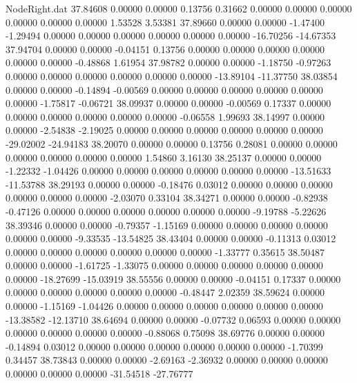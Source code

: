 \begin{filecontents}{NodeRight.dat}
  37.84608    0.00000    0.00000     0.13756    0.31662    0.00000    0.00000    0.00000    0.00000    0.00000    0.00000    1.53528    3.53381
  37.89660    0.00000    0.00000    -1.47400   -1.29494    0.00000    0.00000    0.00000    0.00000    0.00000    0.00000  -16.70256  -14.67353
  37.94704    0.00000    0.00000    -0.04151    0.13756    0.00000    0.00000    0.00000    0.00000    0.00000    0.00000   -0.48868    1.61954
  37.98782    0.00000    0.00000    -1.18750   -0.97263    0.00000    0.00000    0.00000    0.00000    0.00000    0.00000  -13.89104  -11.37750
  38.03854    0.00000    0.00000    -0.14894   -0.00569    0.00000    0.00000    0.00000    0.00000    0.00000    0.00000   -1.75817   -0.06721
  38.09937    0.00000    0.00000    -0.00569    0.17337    0.00000    0.00000    0.00000    0.00000    0.00000    0.00000   -0.06558    1.99693
  38.14997    0.00000    0.00000    -2.54838   -2.19025    0.00000    0.00000    0.00000    0.00000    0.00000    0.00000  -29.02002  -24.94183
  38.20070    0.00000    0.00000     0.13756    0.28081    0.00000    0.00000    0.00000    0.00000    0.00000    0.00000    1.54860    3.16130
  38.25137    0.00000    0.00000    -1.22332   -1.04426    0.00000    0.00000    0.00000    0.00000    0.00000    0.00000  -13.51633  -11.53788
  38.29193    0.00000    0.00000    -0.18476    0.03012    0.00000    0.00000    0.00000    0.00000    0.00000    0.00000   -2.03070    0.33104
  38.34271    0.00000    0.00000    -0.82938   -0.47126    0.00000    0.00000    0.00000    0.00000    0.00000    0.00000   -9.19788   -5.22626
  38.39346    0.00000    0.00000    -0.79357   -1.15169    0.00000    0.00000    0.00000    0.00000    0.00000    0.00000   -9.33535  -13.54825
  38.43404    0.00000    0.00000    -0.11313    0.03012    0.00000    0.00000    0.00000    0.00000    0.00000    0.00000   -1.33777    0.35615
  38.50487    0.00000    0.00000    -1.61725   -1.33075    0.00000    0.00000    0.00000    0.00000    0.00000    0.00000  -18.27699  -15.03919
  38.55556    0.00000    0.00000    -0.04151    0.17337    0.00000    0.00000    0.00000    0.00000    0.00000    0.00000   -0.48447    2.02359
  38.59624    0.00000    0.00000    -1.15169   -1.04426    0.00000    0.00000    0.00000    0.00000    0.00000    0.00000  -13.38582  -12.13710
  38.64694    0.00000    0.00000    -0.07732    0.06593    0.00000    0.00000    0.00000    0.00000    0.00000    0.00000   -0.88068    0.75098
  38.69776    0.00000    0.00000    -0.14894    0.03012    0.00000    0.00000    0.00000    0.00000    0.00000    0.00000   -1.70399    0.34457
  38.73843    0.00000    0.00000    -2.69163   -2.36932    0.00000    0.00000    0.00000    0.00000    0.00000    0.00000  -31.54518  -27.76777

\end{filecontents}
